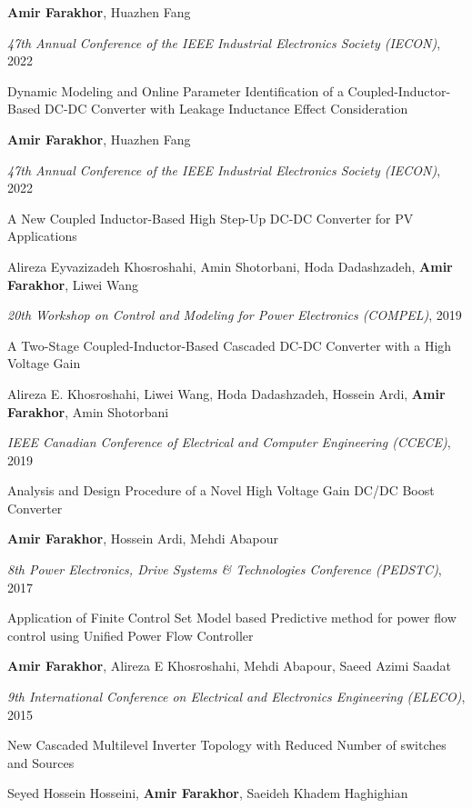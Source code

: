 \documentclass[10pt,letter]{article}
\newcounter{myEnumCounter}
\newcounter{mySaveCounter}
\renewenvironment{enumerate}{%
  \begin{list}{\arabic{myEnumCounter}.}{\usecounter{myEnumCounter}%
  \setcounter{myEnumCounter}{\value{mySaveCounter}}}
  }{%
  \setcounter{mySaveCounter}{\value{myEnumCounter}}\end{list}%
}
\begin{document}
\begin{small}
\begin{enumerate}
\textbf{Amir Farakhor}, Huazhen Fang

{\it 47th Annual Conference of the IEEE Industrial Electronics Society (IECON)}, 2022

    \item 
Dynamic Modeling and Online Parameter Identification of a Coupled-Inductor-Based DC-DC Converter with Leakage Inductance Effect Consideration

\textbf{Amir Farakhor}, Huazhen Fang

{\it 47th Annual Conference of the IEEE Industrial Electronics Society (IECON)}, 2022

    \item 
A New Coupled Inductor-Based High Step-Up DC-DC Converter for PV Applications

Alireza Eyvazizadeh Khosroshahi, Amin Shotorbani, Hoda Dadashzadeh, \textbf{Amir Farakhor}, Liwei Wang

{\it 20th Workshop on Control and Modeling for Power Electronics (COMPEL)}, 2019

    \item 
A Two-Stage Coupled-Inductor-Based Cascaded DC-DC Converter with a High Voltage Gain

Alireza E. Khosroshahi, Liwei Wang, Hoda Dadashzadeh, Hossein Ardi, \textbf{Amir Farakhor}, Amin Shotorbani

{\it IEEE Canadian Conference of Electrical and Computer Engineering (CCECE)}, 2019

    \item 
Analysis and Design Procedure of a Novel High Voltage Gain DC/DC Boost Converter

\textbf{Amir Farakhor}, Hossein Ardi, Mehdi Abapour

{\it 8th Power Electronics, Drive Systems \& Technologies Conference (PEDSTC)}, 2017

    \item 
Application of Finite Control Set Model based Predictive method for power flow control using Unified Power Flow Controller

\textbf{Amir Farakhor}, Alireza E Khosroshahi, Mehdi Abapour, Saeed Azimi Saadat

{\it 9th International Conference on Electrical and Electronics Engineering (ELECO)}, 2015

    \item 
New Cascaded Multilevel Inverter Topology with Reduced Number of switches and Sources

Seyed Hossein Hosseini, \textbf{Amir Farakhor}, Saeideh Khadem Haghighian


\end{enumerate}
\end{small}
\end{document}

